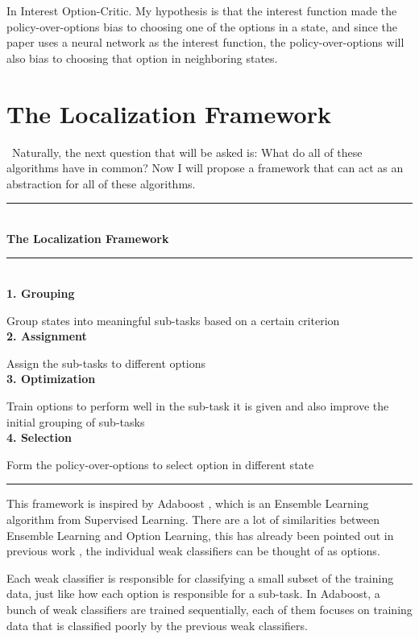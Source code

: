 \documentclass{article}
\begin{document}
	\normalsize{\quad In Interest Option-Critic. My hypothesis is that the interest function made the policy-over-options bias to choosing one of the options in a state, and since the paper uses a neural network as the interest function, the policy-over-options will also bias to choosing that option in neighboring states.}
	\section{The Localization Framework}
	\qquad \ Naturally, the next question that will be asked is: What do all of these algorithms have in common? Now I will propose a framework that can act as an abstraction for all of these algorithms.\vspace{0.1in}\\
	\rule{420pt}{2pt}\vspace{0.1in}\\
	\large{\bfseries{The Localization Framework}}\\
	\rule{420pt}{0.4pt}\\
	\normalsize{\bfseries{1. Grouping}}
	
	\normalsize{Group states into meaningful sub-tasks based on a certain criterion}\\
	{\bfseries{2. Assignment}}
	
	\normalsize{Assign the sub-tasks to different options}\\
	{\bfseries{3. Optimization}}
	
	\normalsize{Train options to perform well in the sub-task it is given and also improve the initial grouping of sub-tasks}\\
	{\bfseries{4. Selection}}
	
	\normalsize{Form the policy-over-options to select option in different state}\\
	\rule{420pt}{2pt}\vspace{0.1in}
	
	\quad This framework is inspired by Adaboost \cite{adaboost}, which is an Ensemble Learning algorithm from Supervised Learning. There are a lot of similarities between Ensemble Learning and Option Learning, this has already been pointed out in previous work \cite{zhang2018ace}, the individual weak classifiers can be thought of as options.
	
	\quad Each weak classifier is responsible for classifying a small subset of the training data, just like how each option is responsible for a sub-task. In Adaboost, a bunch of weak classifiers are trained sequentially, each of them focuses on training data that is classified poorly by the previous weak classifiers.
	
\end{document}
